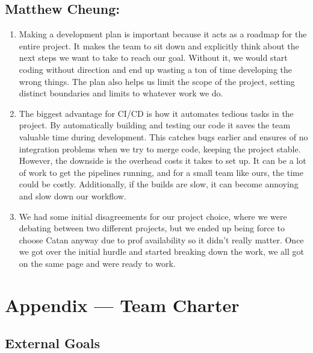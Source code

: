 \documentclass{article}
\begin{document}
\subsection*{Matthew Cheung:}\label{subsec:matthew-cheung-reflection}
\begin{enumerate}
  \item Making a development plan is important because it acts as a roadmap for the entire project.
  It makes the team to sit down and explicitly think about the next steps we want to take to reach our goal.
  Without it, we would start coding without direction and end up wasting a ton of time developing the wrong things.
  The plan also helps us limit the scope of the project, setting distinct boundaries and limits to whatever work we do.

  \item The biggest advantage for CI/CD is how it automates tedious tasks in the project.
  By automatically building and testing our code it saves the team valuable time during development.
  This catches bugs earlier and ensures of no integration problems when we try to merge code, keeping the project stable.
  However, the downside is the overhead costs it takes to set up.
  It can be a lot of work to get the pipelines running, and for a small team like ours, the time could be costly.
  Additionally, if the builds are slow, it can become annoying and slow down our workflow.

  \item We had some initial disagreements for our project choice, where we were debating between two different projects, but we ended up being force to choose Catan anyway due to prof availability so it didn't really matter.
  Once we got over the initial hurdle and started breaking down the work, we all got on the same page and were ready to work.

\end{enumerate}

\section*{Appendix --- Team Charter}


\subsection*{External Goals}

\end{document}
